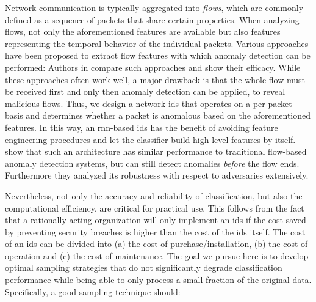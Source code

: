 \documentclass[conference]{IEEEtran}
\begin{document}
Network communication is typically aggregated into \textit{flows}, which are commonly defined as a sequence of packets that share certain properties. When analyzing flows, not only the aforementioned features are available but also features representing the temporal behavior of the individual packets. Various approaches have been proposed to extract flow features with which anomaly detection can be performed: Authors in \cite{meghdouri_analysis_2018} compare such approaches and show their efficacy.
While these approaches often work well, a major drawback is that the whole flow must be received first and only then anomaly detection can be applied, to reveal malicious flows. Thus, we design a network \gls{ids} that operates on a per-packet basis and determines whether a packet is anomalous based on the aforementioned features.
In this way, an \gls{rnn}-based \gls{ids} has the benefit of avoiding feature engineering procedures and let the classifier build high level features by itself.
\cite{hartl_explainability_2020} show that such an architecture has similar performance to traditional flow-based anomaly detection systems, but can still detect anomalies \textit{before} the flow ends. Furthermore they analyzed its robustness with respect to adversaries extensively.


Nevertheless, not only the accuracy and reliability of classification, but also the computational efficiency, are critical for practical use. This follows from the fact that a rationally-acting organization will only implement an \gls{ids} if the cost saved by preventing security breaches is higher than the cost of the \gls{ids} itself. The cost of an \gls{ids} can be divided into (a) the cost of purchase/installation, (b) the cost of operation and (c) the cost of maintenance. The goal we pursue here is to develop optimal sampling strategies that do not significantly degrade classification performance while being able to only process a small fraction of the original data. Specifically, a good sampling technique should:
\end{document}
